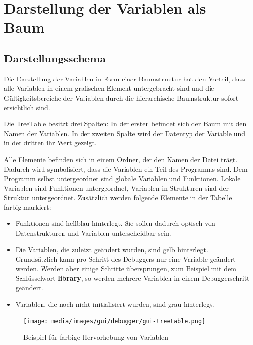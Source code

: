 \section{Darstellung der Variablen als Baum}
\label{treetable}

\subsection{Darstellungsschema}

Die Darstellung der Variablen in Form einer Baumstruktur hat den Vorteil, dass alle Variablen in einem grafischen Element untergebracht sind und die Gültigkeitsbereiche der Variablen durch die hierarchische Baumstruktur sofort ersichtlich sind.

Die TreeTable besitzt drei Spalten: In der ersten befindet sich der Baum mit den Namen der Variablen. In der zweiten Spalte wird der Datentyp der Variable und in der dritten ihr Wert gezeigt.

Alle Elemente befinden sich in einem Ordner, der den Namen der Datei trägt. Dadurch wird symbolisiert, dass die Variablen ein Teil des Programms sind. Dem Programm selbst untergeordnet sind globale Variablen und Funktionen. Lokale Variablen sind Funktionen untergeordnet, Variablen in Strukturen sind der Struktur untergeordnet.
Zusätzlich werden folgende Elemente in der Tabelle farbig markiert:
\begin{itemize}
\item Funktionen sind hellblau hinterlegt. Sie sollen dadurch optisch von Datenstrukturen und Variablen unterscheidbar sein.
\item Die Variablen, die zuletzt geändert wurden, sind gelb hinterlegt. Grundsätzlich kann pro Schritt des Debuggers nur eine Variable geändert werden. Werden aber einige Schritte übersprungen, zum Beispiel mit dem Schlüsselwort \textbf{library}, so werden mehrere Variablen in einem Debuggerschritt geändert.
\item Variablen, die noch nicht initialisiert wurden, sind grau hinterlegt.
\end{itemize}

\begin{figure}[htp]
\centering
\texttt{[image: media/images/gui/debugger/gui-treetable.png]}
\caption{Beispiel für farbige Hervorhebung von Variablen}
\label{fig:deb-tt-example}
\end{figure}

